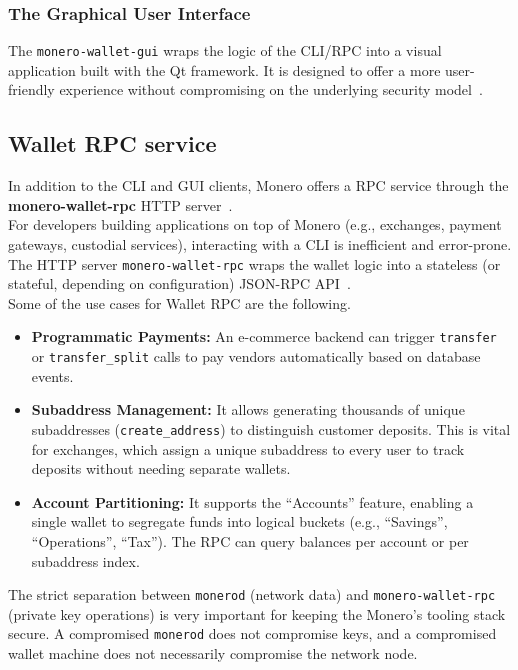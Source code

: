 \documentclass[conference]{IEEEtran}
\begin{document}
\subsubsection{The Graphical User Interface}
The \texttt{monero-wallet-gui} wraps the logic of the CLI/RPC into a visual application built with the Qt framework. It is designed to offer a more user-friendly experience without compromising on the underlying security model~\cite{monero_wallet_gui}.

\subsection{Wallet RPC service}
In addition to the CLI and GUI clients, Monero offers a RPC service through the \textbf{monero-wallet-rpc} HTTP server~\cite{monero_wallet_rpc}.\\
For developers building applications on top of Monero (e.g., exchanges, payment gateways, custodial services), interacting with a CLI is inefficient and error-prone. The HTTP server \texttt{monero-wallet-rpc} wraps the wallet logic into a stateless (or stateful, depending on configuration) JSON-RPC API~\cite{monero_wallet_rpc_api}.\\
Some of the use cases for Wallet RPC are the following.
\begin{itemize}
\item \textbf{Programmatic Payments:} An e-commerce backend can trigger \texttt{transfer} or \texttt{transfer\_split} calls to pay vendors automatically based on database events.~\cite{monero_wallet_rpc_api}
\item \textbf{Subaddress Management:} It allows generating thousands of unique subaddresses (\texttt{create\_address}) to distinguish customer deposits. This is vital for exchanges, which assign a unique subaddress to every user to track deposits without needing separate wallets.~\cite{monero_wallet_rpc_api}
\item \textbf{Account Partitioning:} It supports the ``Accounts'' feature, enabling a single wallet to segregate funds into logical buckets (e.g., ``Savings'', ``Operations'', ``Tax''). The RPC can query balances per account or per subaddress index.~\cite{accepting_monero}
\end{itemize}
\medskip
The strict separation between \texttt{monerod} (network data) and \texttt{monero-wallet-rpc} (private key operations) is very important for keeping the Monero’s tooling stack secure. A compromised \texttt{monerod} does not compromise keys, and a compromised wallet machine does not necessarily compromise the network node.
\end{document}

